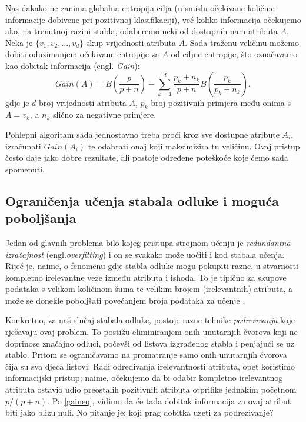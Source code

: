 \documentclass[12pt,a4paper]{article}
\begin{document}
Nas dakako ne zanima globalna entropija cilja (u smislu očekivane količine informacije dobivene pri pozitivnoj klasifikaciji), već
koliko informacija očekujemo ako, na trenutnoj razini stabla, odaberemo neki od dostupnih nam atributa $A$. 
Neka je $\{v_1,v_2,\ldots,v_d\}$ skup vrijednosti atributa $A$.
Sada traženu veličinu možemo dobiti oduzimanjem
očekivane entropije za $A$ od ciljne entropije, što označavamo kao dobitak informacija (engl. \textit{Gain}):
\begin{equation}
    \label{gaineq}
    Gain(A)=B\left(\frac{p}{p+n}\right)-\sum^d_{k=1}\frac{p_k+n_k}{p+n}B(\frac{p_k}{p_k+n_k}),
\end{equation}
gdje je $d$ broj vrijednosti atributa $A$, $p_k$ broj pozitivnih primjera među onima s $A=v_k$, a $n_k$ slično za negativne primjere.

Pohlepni algoritam sada jednostavno treba proći kroz sve dostupne atribute $A_i$, izračunati $Gain(A_i)$ te odabrati
onaj koji maksimizira tu veličinu. Ovaj pristup često daje jako dobre rezultate, ali postoje određene poteškoće koje ćemo
sada spomenuti.

\subsection{Ograničenja učenja stabala odluke i moguća poboljšanja}
Jedan od glavnih problema bilo kojeg pristupa strojnom učenju je \emph{redundantna izražajnost} (engl.\textit{overfitting})
i on se svakako može uočiti i kod stabala učenja. Riječ je, naime, o fenomenu gdje stabla odluke mogu pokupiti razne,
u stvarnosti kompletno irelevantne veze između atributa i ishoda. To je tipično za skupove podataka s velikom količinom šuma te
velikim brojem (irelevantnih) atributa, a može se donekle poboljšati povećanjem broja podataka za učenje \cite{rn}. 

Konkretno, za naš slučaj stabala odluke, postoje razne tehnike \emph{podrezivanja} koje rješavaju ovaj problem.
To postižu eliminiranjem onih unutarnjih čvorova koji ne doprinose značajno odluci, počevši od listova izgrađenog stabla i penjajući
se uz stablo. Pritom se ograničavamo na promatranje samo onih unutarnjih čvorova čija su sva djeca listovi.
Radi određivanja irelevantnosti atributa, opet koristimo informacijski pristup; naime, očekujemo da bi odabir
kompletno irelevantnog atributa ostavio udio preostalih pozitivnih atributa otprilike jednakim početnom $p/(p+n)$.
Po \eqref{gaineq}, vidimo da će tada dobitak informacija za ovaj atribut biti jako blizu nuli. No pitanje je:
koji prag dobitka uzeti za podrezivanje?
\end{document}
